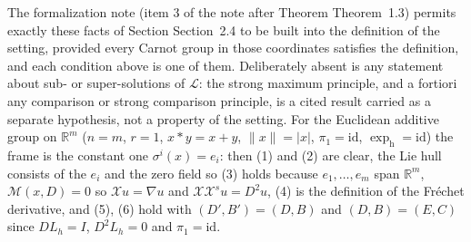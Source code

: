 \begin{definition}
The formalization note (item 3 of the note after Theorem Theorem~1.3) permits exactly these
facts of Section Section~2.4 to be built into the definition of the setting, provided
every Carnot group in those coordinates satisfies the definition, and each condition above
is one of them. Deliberately absent is any statement about sub- or super-solutions of
$\mathcal L$: the strong maximum principle, and a fortiori any comparison or strong
comparison principle, is a cited result carried as a separate hypothesis, not a property of
the setting. For the Euclidean additive group on $\mathbb R^m$ ($n=m$, $r=1$, $x*y=x+y$,
$\|x\|=|x|$, $\pi_1=\mathrm{id}$, $\exp_{\mathrm h}=\mathrm{id}$) the frame is the constant
one $\sigma^i(x)=e_i$: then (1) and (2) are clear, the Lie hull consists of the $e_i$ and
the zero field so (3) holds because $e_1,\ldots,e_m$ span $\mathbb R^m$,
$\mathcal M(x,D)=0$ so $\mathcal Xu=\nabla u$ and
$\mathcal X\mathcal X^{s}u=D^2u$, (4) is the definition of the Fr\'echet derivative,
and (5), (6) hold with $(D',B')=(D,B)$ and $(D,B)=(E,C)$ since $DL_h=I$, $D^2L_h=0$ and
$\pi_1=\mathrm{id}$.
\end{definition}
